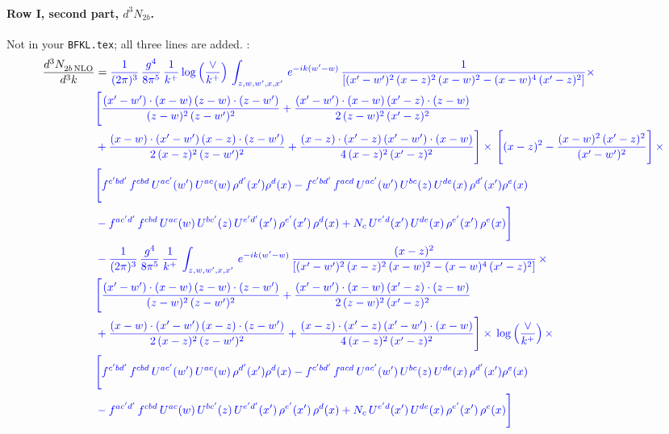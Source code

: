 \documentclass[10pt]{article}
\numberwithin{equation}{section}
\newcommand{\new}[1]{{\color{blue}#1}}
\newcommand{\nc}{\color{blue}}
\begin{document}
\paragraph{Row I, second part, $d^3N_{2b}$.}
Not in your \texttt{BFKL.tex}; all three lines are \new{added}.
\noindent \new{From \texttt{Other\_terms.tex}}:
\begin{align}
    \frac{d^{3}N_{2b\,\rm NLO}^{\rm}}{d^{3}k}  & =  \nc \frac{1}{(2\pi)^{3}}\, \frac{g^{4}}{8\pi^{5}}\,\frac{1}{k^{+}}\,\new{\log{\left(\frac{\vee}{k^{+}}\right)}}\,\int_{z,w,w^{\prime},x,x'}\, e^{-ik(w^{\prime}-w)}\, \frac{1}{\left[(x'-w')^{2}\,(x-z)^{2}\,(x-w)^{2} - (x-w)^{4}\, (x'-z)^{2}\right]} \times\notag \\ & \nc  \Bigg[\frac{(x'-w')\cdot (x-w)\, (z-w)\cdot (z-w')}{(z-w)^{2}\, (z-w')^{2}}+\frac{(x'-w')\cdot (x-w)\, (x'-z)\cdot (z-w)}{2\, (z-w)^{2}\, (x'-z)^{2}}\notag \\ & \nc  +\frac{(x-w)\cdot (x'-w')\, (x-z)\cdot (z-w')}{2\, (x-z)^{2}\, (z-w')^{2}}+\frac{(x-z)\cdot (x'-z)\, (x'-w')\cdot (x-w)}{4\, (x-z)^{2}\, (x'-z)^{2}}\Bigg] \times\,\Bigg[(x-z)^{2} - \frac{(x-w)^{2}\, (x'-z)^{2}}{(x'-w')^{2}}\Bigg]\,\times \notag \\ & \nc  \Bigg[f^{c'bd'}\,f^{cbd}\, U^{ac'}(w')\,U^{ac}(w)\,\rho^{d'}(x')\rho^{d}(x)- f^{c'bd'}\,f^{acd}\,U^{ac'}(w')\,U^{bc}(z)\,U^{de}(x)\,\rho^{d'}(x')\rho^{e}(x) \notag \\ & \nc  -f^{ac'd'}\,f^{cbd}\,U^{ac}(w)\,U^{bc'}(z)\,U^{e'd'}(x')\,\rho^{e'}(x')\,\rho^{d}(x) +N_{c}\,U^{e'd}(x')\,U^{de}(x)\,\rho^{e'}(x')\,\rho^{e}(x)\Bigg] \notag \\
& \nc   - \frac{1}{(2\pi)^{3}}\, \frac{g^{4}}{8\pi^{5}}\,\frac{1}{k^{+}}\,\int_{z,w,w^{\prime},x,x'}\, e^{-ik(w^{\prime}-w)}\, \frac{(x-z)^{2}}{\left[(x'-w')^{2}\,(x-z)^{2}\,(x-w)^{2} - (x-w)^{4}\, (x'-z)^{2}\right]}\,  \times\notag \\ & \nc  \Bigg[\frac{(x'-w')\cdot (x-w)\, (z-w)\cdot (z-w')}{(z-w)^{2}\, (z-w')^{2}}+\frac{(x'-w')\cdot (x-w)\, (x'-z)\cdot (z-w)}{2\, (z-w)^{2}\, (x'-z)^{2}}\notag \\ & \nc  +\frac{(x-w)\cdot (x'-w')\, (x-z)\cdot (z-w')}{2\, (x-z)^{2}\, (z-w')^{2}}+\frac{(x-z)\cdot (x'-z)\, (x'-w')\cdot (x-w)}{4\, (x-z)^{2}\, (x'-z)^{2}}\Bigg] \times\,\new{\log{\left(\frac{\vee}{k^{+}}\right)}}\,\times \notag \\ & \nc  \Bigg[f^{c'bd'}\,f^{cbd}\, U^{ac'}(w')\,U^{ac}(w)\,\rho^{d'}(x')\rho^{d}(x)- f^{c'bd'}\,f^{acd}\,U^{ac'}(w')\,U^{bc}(z)\,U^{de}(x)\,\rho^{d'}(x')\rho^{e}(x) \notag \\ & \nc  -f^{ac'd'}\,f^{cbd}\,U^{ac}(w)\,U^{bc'}(z)\,U^{e'd'}(x')\,\rho^{e'}(x')\,\rho^{d}(x) +N_{c}\,U^{e'd}(x')\,U^{de}(x)\,\rho^{e'}(x')\,\rho^{e}(x)\Bigg] \notag \\

\end{align}
\end{document}
